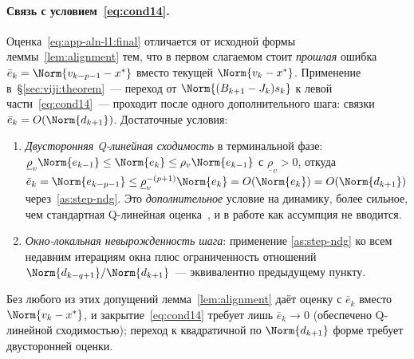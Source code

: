 \paragraph{Связь с условием~\eqref{eq:cond14}.}
Оценка~\eqref{eq:app-aln-l1:final} отличается от исходной формы
леммы~\ref{lem:alignment} тем, что в первом слагаемом стоит \emph{прошлая}
ошибка $\bar e_k = \Norm{v_{k-p-1}-x^{*}}$ вместо текущей
$\Norm{v_k-x^{*}}$. Применение в~\S\ref{sec:viji:theorem}~--- переход от
$\Norm{(B_{k+1}-J_k)s_k}$ к левой части~\eqref{eq:cond14}~--- проходит
после одного дополнительного шага: связки $\bar e_k = O(\Norm{d_{k+1}})$.
Достаточные условия:
\begin{enumerate}\itemsep0pt
  \item \emph{Двусторонняя Q-линейная сходимость} в терминальной фазе:
    $\underline\rho_v\Norm{e_{k-1}}\le\Norm{e_k}\le\rho_v\Norm{e_{k-1}}$
    с $\underline\rho_v > 0$, откуда $\bar e_k = \Norm{e_{k-p-1}}
    \le \underline\rho_v^{-(p+1)}\Norm{e_k} = O(\Norm{e_k}) =
    O(\Norm{d_{k+1}})$ через~\ref{as:step-ndg}. Это
    \emph{дополнительное} условие на динамику, более сильное, чем
    стандартная Q-линейная оценка~\cite[Theorem~3.4]{Agafonov2024VIJI},
    и в работе как ассумпция не вводится.
  \item \emph{Окно-локальная невырожденность шага}: применение
    \ref{as:step-ndg} ко всем недавним итерациям окна плюс ограниченность
    отношений $\Norm{d_{k-q+1}}/\Norm{d_{k+1}}$~--- эквивалентно
    предыдущему пункту.
\end{enumerate}
Без любого из этих допущений лемма~\ref{lem:alignment} даёт оценку с
$\bar e_k$ вместо $\Norm{v_k-x^{*}}$, и закрытие~\eqref{eq:cond14}
требует лишь $\bar e_k\to 0$ \textup{(}обеспечено Q-линейной сходимостью\textup{)};
переход к квадратичной по $\Norm{d_{k+1}}$ форме требует двусторонней
оценки.
